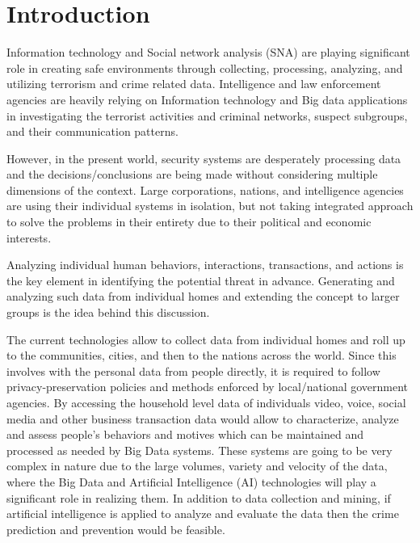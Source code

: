 \documentclass[sigconf]{acmart}
\begin{document}

\maketitle

\section{Introduction}
Information technology and Social network analysis (SNA) are playing significant role in creating safe environments through collecting, processing, analyzing, and utilizing terrorism and crime related data\cite{Kantor2005}. Intelligence and law enforcement agencies are heavily relying on Information technology and Big data applications in investigating the terrorist activities and criminal networks, suspect subgroups, and their communication patterns.

However, in the present world, security systems are desperately processing data and the decisions/conclusions are being made without considering multiple dimensions of the context. Large corporations, nations, and intelligence agencies are using their individual systems in isolation, but not taking integrated approach to solve the problems in their entirety due to their political and economic interests.

Analyzing individual human behaviors, interactions, transactions, and actions is the key element in identifying the potential threat in advance. Generating and analyzing such data from individual homes and extending the concept to larger groups is the idea behind this discussion.

The current technologies allow to collect data from individual homes and roll up to the communities, cities, and then to the nations across the world. Since this involves with the personal data from people directly, it is required to follow privacy-preservation policies and methods enforced by local/national government agencies. By accessing the household level data of individuals video, voice, social media and other business transaction data would allow to characterize, analyze and assess people's behaviors and motives which can be maintained and processed as needed by Big Data systems. These systems are going to be very complex in nature due to the large volumes, variety and velocity of the data, where the Big Data and Artificial Intelligence (AI) technologies will play a significant role in realizing them. In addition to data collection and mining, if artificial intelligence is applied to analyze and evaluate the data then the crime prediction and prevention would be feasible.
\end{document}
